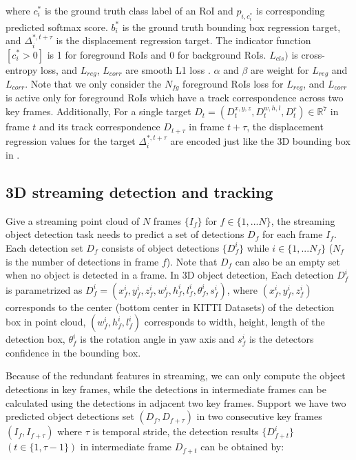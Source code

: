 \documentclass{bmvc2k}
\begin{document}
where $c^*_i$ is the ground truth class label of an RoI and $p_{i, c^*_i}$ is corresponding predicted softmax score. $b^*_i$ is the ground truth bounding box regression target, and $\Delta^{*, t+\tau}_i$ is the displacement regression target. The indicator function $ [c^*_i > 0]$ is 1 for foreground RoIs and 0 for background RoIs. $L_{cls})$ is cross-entropy loss, and $L_{reg}$, $L_{corr}$ are smooth L1 loss \cite{girshick2015fast}. $\alpha$ and $\beta$ are weight for $L_{reg}$ and $L_{corr}$. Note that we only consider the $N_{fg}$ foreground RoIs loss for $L_{reg}$, and $L_{corr}$ is active only for foreground RoIs which have a track correspondence across two key frames. Additionally, For a single target $D_t = (D^{x,y,z}_t, D^{w,h,l}_t, D^r_t) \in \mathbb{R}^7$ in frame $t$ and its track correspondence $D_{t+\tau}$ in frame $t+\tau$, the displacement regression values for the target $ \Delta^{*, t+\tau}_i$ are encoded just like the 3D bounding box in \cite{ku2018joint}.

\subsection{3D streaming detection and tracking}
Give a streaming point cloud of $N$ frames $\{I_f\}$ for $f \in \{1, ... N\}$, the streaming object detection task needs to predict a set of detections $D_f$ for each frame $I_f$. Each detection set $D_f$ consists of object detections $\{D^i_f\}$ while $i \in \{1,...N_f\}$ ($N_f$ is the number of detections in frame $f$). Note that $D_f$ can also be an empty set when no object is detected in a frame. In 3D object detection, Each detection $D^i_f$ is parametrized as $D^i_f = (x^i_f, y^i_f, z^i_f, w^i_f, h^i_f, l^i_f, \theta^i_f, s^i_f)$, where $(x^i_f, y^i_f, z^i_f)$ corresponds to the center (bottom center in KITTI\cite{geiger2013vision} Datasets) of the detection box in point cloud, $(w^i_f, h^i_f, l^i_f)$ corresponds to width, height, length of the detection box, $\theta^i_f$ is the rotation angle in yaw axis and $s^i_f$ is the detectors confidence in the bounding box.

Because of the redundant features in streaming, we can only compute the object detections in key frames, while the detections in intermediate frames can be calculated using the detections in adjacent two key frames. Support we have two predicted object detections set $(D_f, D_{f+\tau})$ in two consecutive key frames $(I_f, I_{f+\tau})$ where $\tau$ is temporal stride, the detection results $\{D^i_{f+t}\}$ $(t \in \{1, \tau-1\})$ in intermediate frame $D_{f+t}$ can be obtained by:
\end{document}
